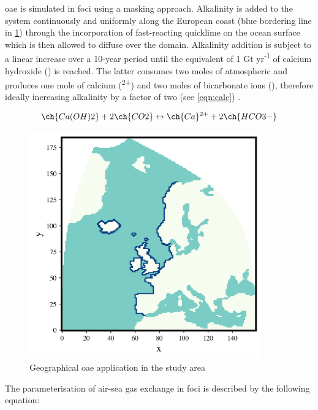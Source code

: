 \ac{oae} is simulated in \ac{foci} using a masking approach. Alkalinity is added to the system continuously and uniformly along the European coast (blue bordering line in \cref{oaemodel}) through the incorporation of fast-reacting quicklime on the ocean surface which is then allowed to diffuse over the domain. Alkalinity addition is subject to a linear increase over a 10-year period until the equivalent of 1 Gt yr\textsuperscript{-1} of calcium hydroxide () is reached. The latter consumes two moles of atmospheric  and produces one mole of calcium (\textsuperscript{2+}) and two moles of bicarbonate ions (), therefore ideally increasing alkalinity by a factor of two (see \eqref{eqn:calc}) \citep{chien2022foci}. 

\begin{center}

\begin{equation} 
\label{eqn:calc}
\ch{Ca(OH)2} + 2\ch{CO2} \leftrightarrow \ch{Ca}\textsuperscript{2+} + 2\ch{HCO3-}
\end{equation}

\end{center}

\begin{figure}[H]
\caption[\texorpdfstring{OAE}{OAE} application in the study area]{Geographical \ac{oae} application in the study area}
\label{oaemodel}
\centering
\includegraphics[width=10cm]{fig/2_Methods/mesh_mask_area.png}

\end{figure}

The parameterisation of air-sea gas exchange in \ac{foci} is described by the following equation:

